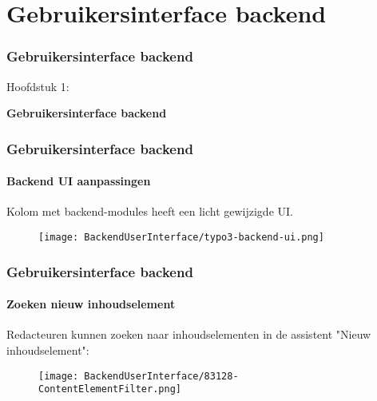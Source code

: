 %

\section{Gebruikersinterface backend}
\begin{frame}[fragile]
	\frametitle{Gebruikersinterface backend}

	\begin{center}\huge{Hoofdstuk 1:}\end{center}
	\begin{center}\huge{\color{typo3darkgrey}\textbf{Gebruikersinterface backend}}\end{center}

\end{frame}


\begin{frame}[fragile]
	\frametitle{Gebruikersinterface backend}
	\framesubtitle{Backend UI aanpassingen}

	Kolom met backend-modules heeft een licht gewijzigde UI.

	\begin{figure}
		\texttt{[image: BackendUserInterface/typo3-backend-ui.png]}
	\end{figure}

\end{frame}


\begin{frame}[fragile]
	\frametitle{Gebruikersinterface backend}
	\framesubtitle{Zoeken nieuw inhoudselement}

	Redacteuren kunnen zoeken naar inhoudselementen in de assistent "Nieuw inhoudselement":

	\begin{figure}
		\texttt{[image: BackendUserInterface/83128-ContentElementFilter.png]}
	\end{figure}

\end{frame}

